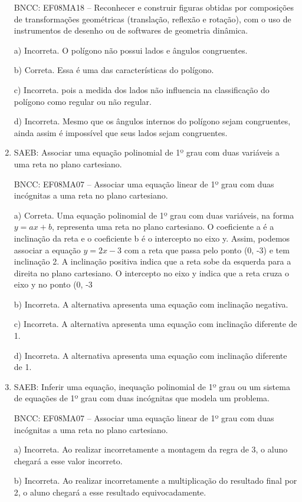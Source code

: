 \begin{enumerate}
BNCC: EF08MA18 -- Reconhecer e construir figuras obtidas por composições
de transformações geométricas (translação, reflexão e rotação), com o
uso de instrumentos de desenho ou de softwares de geometria dinâmica.

a) Incorreta. O polígono não possui lados e ângulos congruentes.

b) Correta. Essa é uma das características do polígono.

c) Incorreta. pois a medida dos lados não influencia na classificação
do polígono como regular ou não regular.

d) Incorreta. Mesmo que os ângulos internos do polígono sejam
congruentes, ainda assim é impossível que seus lados sejam congruentes.

\item SAEB: Associar uma equação polinomial de 1º grau com duas variáveis a
uma reta no plano cartesiano.

BNCC: EF08MA07 -- Associar uma equação linear de 1º grau com duas
incógnitas a uma reta no plano cartesiano.

a) Correta. Uma equação polinomial de 1º grau com duas variáveis,
na forma $y = ax + b$, representa uma reta no plano cartesiano. O
coeficiente a é a inclinação da reta e o coeficiente b é o intercepto no
eixo y. Assim, podemos associar a equação $y = 2x - 3$ com a reta que
passa pelo ponto (0, -3) e tem inclinação 2. A inclinação positiva
indica que a reta sobe da esquerda para a direita no plano cartesiano. O
intercepto no eixo y indica que a reta cruza o eixo y no ponto (0, -3

b) Incorreta. A alternativa apresenta uma equação com inclinação
negativa.

c) Incorreta. A alternativa apresenta uma equação com inclinação
diferente de 1.

d) Incorreta. A alternativa apresenta uma equação com inclinação
diferente de 1.

\item SAEB: Inferir uma equação, inequação polinomial de 1º grau ou um sistema
de equações de 1º grau com duas incógnitas que modela um problema.

BNCC: EF08MA07 -- Associar uma equação linear de 1º grau com duas
incógnitas a uma reta no plano cartesiano.

a) Incorreta. Ao realizar incorretamente a montagem da
regra de 3, o aluno chegará a esse valor incorreto.

b) Incorreta. Ao realizar incorretamente a
multiplicação do resultado final por 2, o aluno chegará a esse resultado
equivocadamente.


\end{enumerate}
